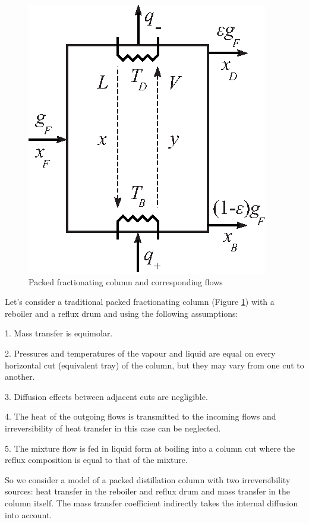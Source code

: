 \documentclass[12pt]{article}
\begin{document}
\begin{figure}[bth]
\centering
\includegraphics{pic1new.eps}
\caption{Packed fractionating column and corresponding flows}
\label{fig:pic1new}
\end{figure}

Let's consider a traditional packed fractionating column (Figure \ref{fig:pic1new}) with a reboiler and a reflux drum and using the following assumptions:

1.	Mass transfer is equimolar.

2.	Pressures and temperatures of the vapour and liquid are equal on every horizontal cut (equivalent tray) of the column, but they may vary from one cut to another.

3.	Diffusion effects between adjacent cuts are negligible. 

4.      The heat of the outgoing flows is transmitted to the incoming flows and irreversibility  of heat transfer in this case can be neglected.

5.      The mixture flow is fed in liquid form at boiling into a column cut where the reflux composition is equal to that of the mixture.

   So we consider a model of a packed distillation column with two irreversibility sources: heat transfer in the reboiler and reflux drum and mass transfer in the column itself. The mass transfer coefficient indirectly takes the internal diffusion into account.   
\end{document}
